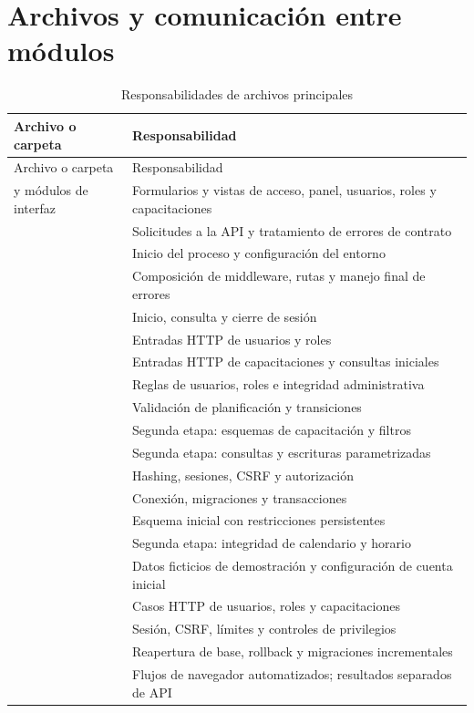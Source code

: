 \section{Archivos y comunicación entre módulos}
\begin{longtable}{P{5.7cm}P{7cm}}
\caption{Responsabilidades de archivos principales}\\
\toprule Archivo o carpeta & Responsabilidad \\ \midrule
\endfirsthead
\toprule Archivo o carpeta & Responsabilidad \\ \midrule
\endhead
{} y módulos de interfaz & Formularios y vistas de acceso, panel, usuarios, roles y capacitaciones \\
 & Solicitudes a la API y tratamiento de errores de contrato \\
 & Inicio del proceso y configuración del entorno \\
 & Composición de middleware, rutas y manejo final de errores \\
 & Inicio, consulta y cierre de sesión \\
 & Entradas HTTP de usuarios y roles \\
 & Entradas HTTP de capacitaciones y consultas iniciales \\
 & Reglas de usuarios, roles e integridad administrativa \\
 & Validación de planificación y transiciones \\
 & Segunda etapa: esquemas de capacitación y filtros \\
 & Segunda etapa: consultas y escrituras parametrizadas \\
 & Hashing, sesiones, CSRF y autorización \\
 & Conexión, migraciones y transacciones \\
 & Esquema inicial con restricciones persistentes \\
 & Segunda etapa: integridad de calendario y horario \\
 & Datos ficticios de demostración y configuración de cuenta inicial \\
 & Casos HTTP de usuarios, roles y capacitaciones \\
 & Sesión, CSRF, límites y controles de privilegios \\
 & Reapertura de base, rollback y migraciones incrementales \\
 & Flujos de navegador automatizados; resultados separados de API \\
\bottomrule
\end{longtable}


